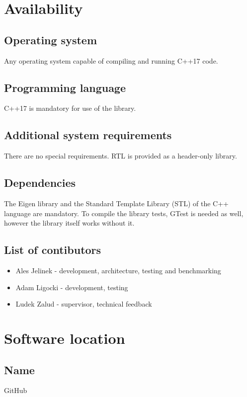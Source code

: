 \documentclass[
    letterpaper, 
    10 pt, 
    conference,
    table,
]{ieeeconf}
\begin{document}
\section*{Availability}
\vspace{0.5cm}

\subsection*{Operating system}
Any operating system capable of compiling and running C++17 code.

\subsection*{Programming language}
C++17 is mandatory for use of the library. 

\subsection*{Additional system requirements}
There are no special requirements. RTL is provided as a header-only library.

\subsection*{Dependencies}
The Eigen library \cite{eigen}  and the Standard Template Library (STL) of the C++ language are mandatory. To compile the library tests, GTest is needed as well, however the library itself works without it.

\subsection*{List of contibutors}
\begin{itemize}
    \item Ales Jelinek - development, architecture, testing and benchmarking
    \item Adam Ligocki - development, testing
    \item Ludek Zalud - supervisor, technical feedback
\end{itemize}

\section*{Software location}

\subsection*{Name} 
GitHub
\end{document}
